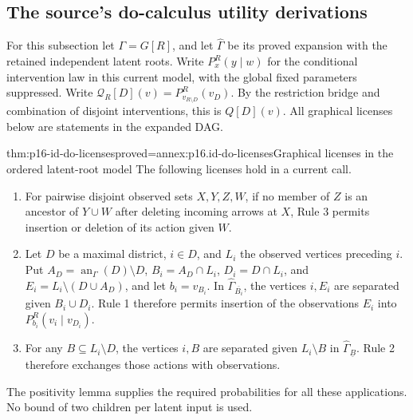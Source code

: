 \subsection{The source's do-calculus utility derivations}

For this subsection let \(\Gamma=G[R]\), and let
\(\widehat\Gamma\) be its proved expansion with the retained
independent latent roots. Write \(P^R_x(y\mid w)\) for the
conditional intervention law in this current model, with the global
fixed parameters suppressed. Write
\(\mathcal Q_R[D](v)=P^R_{v_{R\setminus D}}(v_D)\). By the restriction
bridge and combination of disjoint interventions, this is \(Q[D](v)\).
All graphical licenses below are statements in the expanded DAG.

\begin{hblemma}{thm:p16-id-do-licenses}{proved=annex:p16.id-do-licenses}{Graphical licenses in the ordered latent-root model}
The following licenses hold in a current call.
\begin{enumerate}
\item For pairwise disjoint observed sets \(X,Y,Z,W\), if no
      member of \(Z\) is an ancestor of \(Y\cup W\) after
      deleting incoming arrows at \(X\), Rule 3 permits insertion
      or deletion of its action given \(W\).
\item Let \(D\) be a maximal district, \(i\in D\), and
      \(L_i\) the observed vertices preceding \(i\). Put
      \(A_D=\operatorname{an}_{\Gamma}(D)\setminus D\),
      \(B_i=A_D\cap L_i\), \(D_i=D\cap L_i\), and
      \(E_i=L_i\setminus(D\cup A_D)\), and let
      \(b_i=v_{B_i}\). In
      \(\widehat\Gamma_{\overline{B_i}}\), the vertices
      \(i,E_i\) are separated given \(B_i\cup D_i\).
      Rule 1 therefore permits insertion of the observations \(E_i\)
      into \(P^R_{b_i}(v_i\mid v_{D_i})\).
\item For any \(B\subseteq L_i\setminus D\), the vertices
      \(i,B\) are separated given \(L_i\setminus B\) in
      \(\widehat\Gamma_{\underline B}\). Rule 2 therefore
      exchanges those actions with observations.
\end{enumerate}
The positivity lemma supplies the required probabilities for all
these applications. No bound of two children per latent input is used.
\end{hblemma}

